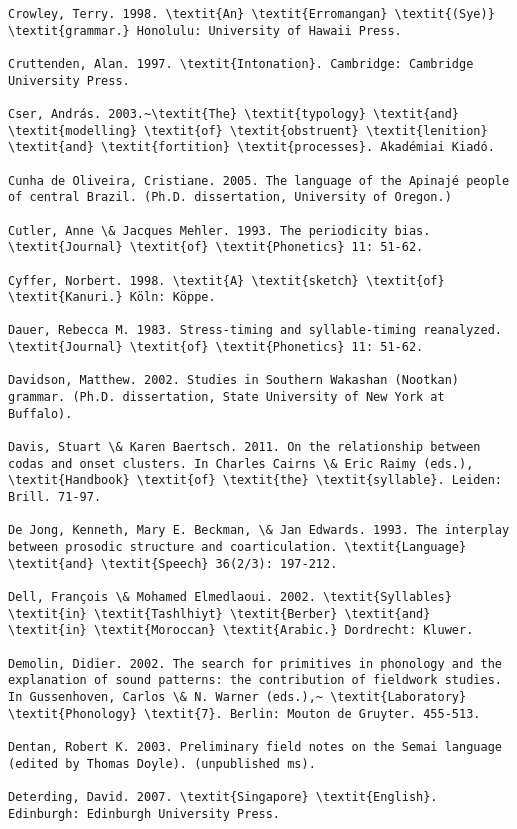 \begin{verbatim}
Crowley, Terry. 1998. \textit{An} \textit{Erromangan} \textit{(Sye)} \textit{grammar.} Honolulu: University of Hawaii Press.

Cruttenden, Alan. 1997. \textit{Intonation}. Cambridge: Cambridge University Press.

Cser, András. 2003.~\textit{The} \textit{typology} \textit{and} \textit{modelling} \textit{of} \textit{obstruent} \textit{lenition} \textit{and} \textit{fortition} \textit{processes}. Akadémiai Kiadó.

Cunha de Oliveira, Cristiane. 2005. The language of the Apinajé people of central Brazil. (Ph.D. dissertation, University of Oregon.)

Cutler, Anne \& Jacques Mehler. 1993. The periodicity bias. \textit{Journal} \textit{of} \textit{Phonetics} 11: 51-62.

Cyffer, Norbert. 1998. \textit{A} \textit{sketch} \textit{of} \textit{Kanuri.} Köln: Köppe.

Dauer, Rebecca M. 1983. Stress-timing and syllable-timing reanalyzed. \textit{Journal} \textit{of} \textit{Phonetics} 11: 51-62.

Davidson, Matthew. 2002. Studies in Southern Wakashan (Nootkan) grammar. (Ph.D. dissertation, State University of New York at Buffalo).

Davis, Stuart \& Karen Baertsch. 2011. On the relationship between codas and onset clusters. In Charles Cairns \& Eric Raimy (eds.), \textit{Handbook} \textit{of} \textit{the} \textit{syllable}. Leiden: Brill. 71-97.

De Jong, Kenneth, Mary E. Beckman, \& Jan Edwards. 1993. The interplay between prosodic structure and coarticulation. \textit{Language} \textit{and} \textit{Speech} 36(2/3): 197-212.

Dell, François \& Mohamed Elmedlaoui. 2002. \textit{Syllables} \textit{in} \textit{Tashlhiyt} \textit{Berber} \textit{and} \textit{in} \textit{Moroccan} \textit{Arabic.} Dordrecht: Kluwer. 

Demolin, Didier. 2002. The search for primitives in phonology and the explanation of sound patterns: the contribution of fieldwork studies. In Gussenhoven, Carlos \& N. Warner (eds.),~ \textit{Laboratory} \textit{Phonology} \textit{7}. Berlin: Mouton de Gruyter. 455-513.

Dentan, Robert K. 2003. Preliminary field notes on the Semai language (edited by Thomas Doyle). (unpublished ms).

Deterding, David. 2007. \textit{Singapore} \textit{English}. Edinburgh: Edinburgh University Press.


\end{verbatim}
